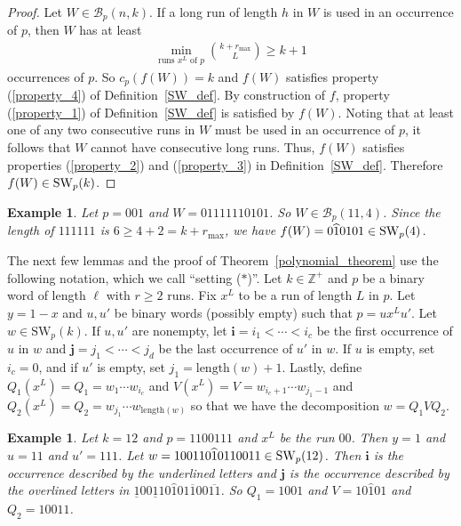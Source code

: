 \documentclass[11pt]{amsart}
\newtheorem{ex}[theorem]{Example}
\newcommand{\ZZ}{\mathbb{Z}}
\newcommand{\settingstar}{{\normalfont(\hyperref[setting_star]{$\ast$})}}
\newcommand{\hatted}[1]{\widehat{#1}}
\begin{document}
\begin{proof}
    Let $W\in\mathcal{B}_p(n,k)$. If a long run of length $h$ in $W$ is used in an occurrence of $p$, then $W$ has at least 
    \begin{align*}
        \min_{\text{runs~}x^L\text{~of~}p}{k+r_{\max}\choose L}\geq k+1
    \end{align*}
    occurrences of $p$. So $c_p(f(W))=k$ and $f(W)$ satisfies property (\ref{property_4}) of Definition~\ref{SW_def}. By construction of $f$, property (\ref{property_1}) of Definition~\ref{SW_def} is satisfied by $f(W)$. Noting that at least one of any two consecutive runs in $W$ must be used in an occurrence of $p$, it follows that $W$ cannot have consecutive long runs. Thus, $f(W)$ satisfies properties (\ref{property_2}) and (\ref{property_3}) in Definition~\ref{SW_def}. Therefore $f(W)\in \text{\normalfont SW}_p(k)$.
\end{proof}

\begin{ex}
    \normalfont Let $p=001$ and $W=01111110101$. So $W\in\mathcal{B}_p(11,4)$. Since the length of $111111$ is $6\geq 4+2=k+r_{\max}$, we have $f(W)=0\hatted{1}0101\in \text{\normalfont SW}_p(4)$.
\end{ex}

\label{setting_star}
The next few lemmas and the proof of Theorem~\ref{polynomial_theorem} use the following notation, which we call ``setting \settingstar''. Let $k\in\ZZ^+$ and $p$ be a binary word of length $\ell$ with $r\geq2$ runs. Fix $x^L$ to be a run of length $L$ in $p$. Let $y=1-x$ and $u,u'$ be binary words (possibly empty) such that $p=ux^L u'$. Let $w\in\text{SW}_p(k)$. If $u,u'$ are nonempty, let $\mathbf{i}=i_1<\cdots<i_{c}$ be the first occurrence of $u$ in $w$ and $\mathbf{j}=j_1<\cdots<j_{d}$ be the last occurrence of $u'$ in $w$. If $u$ is empty, set $i_{c}=0$, and if $u'$ is empty, set $j_1=\text{length}(w)+1$. Lastly, define $Q_1(x^L)=Q_1=w_{1}\cdots w_{i_c}$ and $V(x^L)=V=w_{i_{c}+1}\cdots w_{j_1-1}$ and $Q_2(x^L)=Q_2=w_{j_1}\cdots w_{\text{length}(w)}$ so that we have the decomposition $w=Q_1VQ_2$.

\begin{ex}
    \normalfont Let $k=12$ and $p=1100111$ and $x^L$ be the run $00$. Then $y=1$ and $u=11$ and $u'=111$. Let $w=100110\hatted{1}0110011\in\text{\normalfont SW}_p(12)$. Then $\mathbf{i}$ is the occurrence described by the underlined letters and $\mathbf{j}$ is the occurrence described by the overlined letters in $\underline{1}00\underline{1}10\hatted{1}01\overline{1}00\overline{11}$. So $Q_1=1001$ and $V=10\hatted{1}01$ and $Q_2=10011$.
\end{ex}
\end{document}

